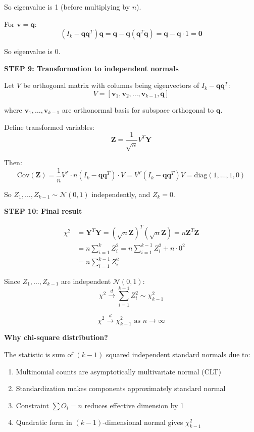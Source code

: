 \documentclass[12pt]{article}
\begin{document}
\begin{solution}
So eigenvalue is 1 (before multiplying by $n$).

For $\mathbf{v} = \mathbf{q}$:
\[
(I_k - \mathbf{q}\mathbf{q}^T)\mathbf{q} = \mathbf{q} - \mathbf{q}(\mathbf{q}^T\mathbf{q}) = \mathbf{q} - \mathbf{q} \cdot 1 = \mathbf{0}
\]

So eigenvalue is 0.

\textbf{STEP 9: Transformation to independent normals}

Let $V$ be orthogonal matrix with columns being eigenvectors of $I_k - \mathbf{q}\mathbf{q}^T$:
\[
V = [\mathbf{v}_1, \mathbf{v}_2, \ldots, \mathbf{v}_{k-1}, \mathbf{q}]
\]

where $\mathbf{v}_1, \ldots, \mathbf{v}_{k-1}$ are orthonormal basis for subspace orthogonal to $\mathbf{q}$.

Define transformed variables:
\[
\mathbf{Z} = \frac{1}{\sqrt{n}}V^T\mathbf{Y}
\]

Then:
\[
\text{Cov}(\mathbf{Z}) = \frac{1}{n}V^T \cdot n(I_k - \mathbf{q}\mathbf{q}^T) \cdot V = V^T(I_k - \mathbf{q}\mathbf{q}^T)V = \text{diag}(1, \ldots, 1, 0)
\]

So $Z_1, \ldots, Z_{k-1} \sim \mathcal{N}(0, 1)$ independently, and $Z_k = 0$.

\textbf{STEP 10: Final result}

\begin{align*}
\chi^2 &= \mathbf{Y}^T\mathbf{Y} = (\sqrt{n}\mathbf{Z})^T(\sqrt{n}\mathbf{Z}) = n\mathbf{Z}^T\mathbf{Z} \\
&= n\sum_{i=1}^k Z_i^2 = n\sum_{i=1}^{k-1} Z_i^2 + n \cdot 0^2 \\
&= n\sum_{i=1}^{k-1} Z_i^2
\end{align*}

Since $Z_1, \ldots, Z_{k-1}$ are independent $\mathcal{N}(0, 1)$:
\[
\chi^2 \xrightarrow{d} \sum_{i=1}^{k-1} Z_i^2 \sim \chi^2_{k-1}
\]

\[
\boxed{\chi^2 \xrightarrow{d} \chi^2_{k-1} \text{ as } n \to \infty}
\]

\textbf{Why chi-square distribution?}

The statistic is sum of $(k-1)$ squared independent standard normals due to:
\begin{enumerate}
    \item Multinomial counts are asymptotically multivariate normal (CLT)
    \item Standardization makes components approximately standard normal
    \item Constraint $\sum O_i = n$ reduces effective dimension by 1
    \item Quadratic form in $(k-1)$-dimensional normal gives $\chi^2_{k-1}$
\end{enumerate}

\end{solution}
\end{document}
